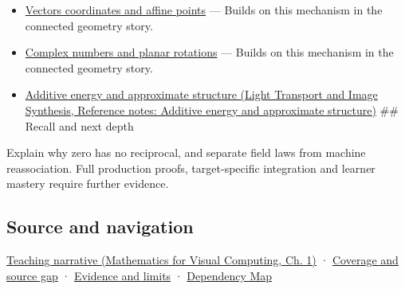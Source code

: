 \begin{itemize}
\item
  \hyperref[appendix-0659864c0aa3]{Vectors coordinates and affine points} --- Builds on this mechanism in the connected geometry story.
\item
  \hyperref[appendix-f77eadcc4a93]{Complex numbers and planar rotations} --- Builds on this mechanism in the connected geometry story.
\item
  \href{../04-Light-Transport-and-Image-Synthesis/main.pdf\#nameddest=appendix-b0732b22e7d6}{Additive energy and approximate structure (Light Transport and Image Synthesis, Reference notes: Additive energy and approximate structure)} \#\# Recall and next depth
\end{itemize}

Explain why zero has no reciprocal, and separate field laws from machine reassociation. Full production proofs, target-specific integration and learner mastery require further evidence.

\subsection{Source and navigation}\label{appendix-52051ad550fe-source-and-navigation}

\hypertarget{appendix-52051ad550fe-source-and-navigation}{}

\href{../02-Mathematics-for-Visual-Computing/main.pdf\#nameddest=01-foundations-i-ch017-numbers-become-a-system-of-permitted-operations}{Teaching narrative (Mathematics for Visual Computing, Ch. 1)} · \hyperref[appendix-fd090d982a15-phase-6---parts-501-600]{Coverage and source gap} · \hyperref[appendix-a103e7846d21-phase-6---source-analysis-and-verification]{Evidence and limits} · \hyperref[appendix-4ad47bdd269a]{Dependency Map}
